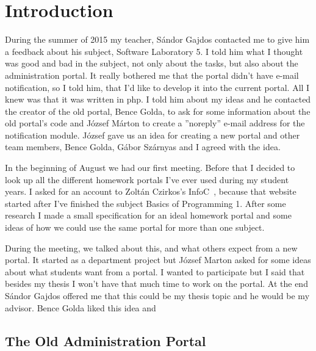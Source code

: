 \chapter{Introduction}

During the summer of 2015 my teacher, Sándor Gajdos contacted me to give him a feedback about his subject, Software Laboratory 5. I told him what I thought was good and bad in the subject, not only about the tasks, but also about the administration portal. It really bothered me that the portal didn't have e-mail notification, so I told him, that I'd like to develop it into the current portal. All I knew was that it was written in php. I told him about my ideas and he contacted the creator of the old portal, Bence Golda, to ask for some information about the old portal's code and József Márton to create a ''noreply'' e-mail address for the notification module. József gave us an idea for creating a new portal and other team members, Bence Golda, Gábor Szárnyas and I agreed with the idea. 

In the beginning of August we had our first meeting. Before that I decided to look up all the different homework portals I've ever used during my student years. I asked for an account to Zoltán Czirkos's InfoC~\cite{InfoC}, because that website started after I've finished the subject Basics of Programming 1. After some research I made a small specification for an ideal homework portal and some ideas of how we could use the same portal for more than one subject.

During the meeting, we talked about this, and what others expect from a new portal. It started as a department project but József Marton asked for some ideas about what students want from a portal. I wanted to participate but I said that besides my thesis I won't have that much time to work on the portal. At the end Sándor Gajdos offered me that this could be my thesis topic and he would be my advisor. Bence Golda liked this idea and 


\section{The Old Administration Portal} 

